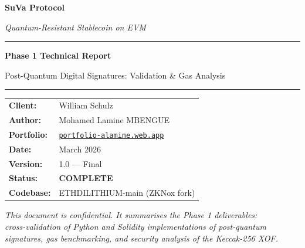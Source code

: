 \documentclass[11pt,a4paper]{article}
\begin{document}

\begin{titlepage}
\centering
\vspace*{2cm}
{\Huge\bfseries\textcolor{suva-blue}{SuVa Protocol}\par}
\vspace{0.5cm}
{\Large\textit{Quantum-Resistant Stablecoin on EVM}\par}
\vspace{1.5cm}
\rule{\linewidth}{0.5pt}
\vspace{0.5cm}
{\LARGE\bfseries Phase 1 Technical Report\par}
\vspace{0.3cm}
{\large Post-Quantum Digital Signatures: Validation \& Gas Analysis\par}
\vspace{0.5cm}
\rule{\linewidth}{0.5pt}
\vspace{2cm}

\begin{tabular}{ll}
\textbf{Client:}   & William Schulz \\[4pt]
\textbf{Author:}   & Mohamed Lamine MBENGUE \\[4pt]
\textbf{Portfolio:} & \href{https://portfolio-alamine.web.app}{\texttt{portfolio-alamine.web.app}} \\[4pt]
\textbf{Date:}     & March 2026 \\[4pt]
\textbf{Version:}  & 1.0 — Final \\[4pt]
\textbf{Status:}   & \textcolor{pass-green}{\textbf{COMPLETE}} \\[4pt]
\textbf{Codebase:} & ETHDILITHIUM-main (ZKNox fork) \\
\end{tabular}

\vfill
\begin{tcolorbox}[enhanced,colback=suva-blue!8,colframe=suva-blue,arc=4mm]
\centering\textit{This document is confidential. It summarises the Phase 1 deliverables:\\
cross-validation of Python and Solidity implementations of post-quantum\\
signatures, gas benchmarking, and security analysis of the Keccak-256 XOF.}
\end{tcolorbox}
\end{titlepage}

\tableofcontents
\newpage

\end{document}
